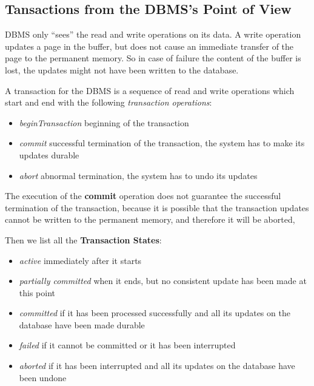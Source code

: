 \subsection{Tansactions from the DBMS’s Point of View}
\begin{tcolorbox}
DBMS only “sees” the read and write operations on its data. A write operation updates a page in the buffer, but does not cause an immediate transfer of the page to the permanent memory. So in case of failure the content of the buffer is lost, the updates might not have been written to the database.
\end{tcolorbox}

A transaction for the DBMS is a sequence of read and write operations which start and end with the following \textit{transaction operations}:
\begin{itemize}
    \item \textit{beginTransaction} beginning of the transaction
    \item \textit{commit} successful termination of the transaction, the system has to make its updates durable
    \item \textit{abort} abnormal termination, the system has to undo its updates
\end{itemize}

\begin{tcolorbox}
The execution of the \textbf{commit} operation does not guarantee the successful termination of the transaction, because it is possible that the transaction updates cannot be written to the permanent memory, and therefore it will be aborted,
\end{tcolorbox}

Then we list all the \textbf{Transaction States}:
\begin{itemize}
    \item \textit{active} immediately after it starts
    \item \textit{partially committed} when it ends, but no consistent update has been made at this point
    \item \textit{committed} if it has been processed successfully and all its updates on the database have been made durable
    \item \textit{failed} if it cannot be committed or it has been interrupted
    \item \textit{aborted} if it has been interrupted and all its updates on the database have been undone
\end{itemize}

